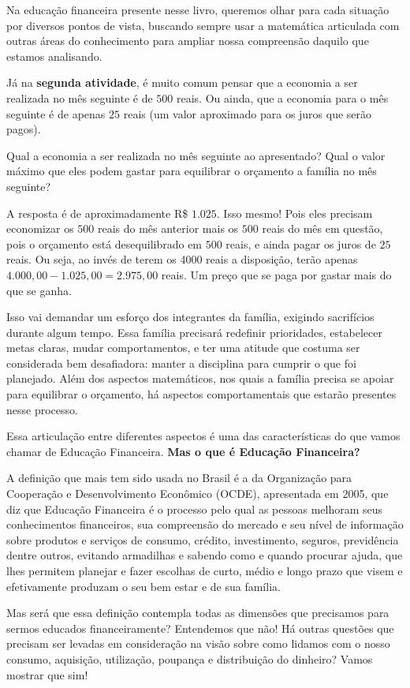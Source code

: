 Na educação financeira presente nesse livro, queremos olhar para cada situação por diversos pontos de vista, buscando sempre usar a matemática articulada com outras áreas do conhecimento para ampliar nossa compreensão daquilo que estamos analisando.

Já na \textbf{segunda atividade}, é muito comum pensar que a economia a ser realizada no mês seguinte é de $500$ reais. Ou ainda, que a economia para o mês seguinte é de apenas $25$ reais (um valor aproximado para os juros que serão pagos). 


Qual a economia a ser realizada no mês seguinte ao apresentado? Qual o valor máximo que eles podem gastar para equilibrar o orçamento a família no mês seguinte? 

A resposta é de aproximadamente R\$ $1.025$. Isso mesmo! Pois eles precisam economizar os $500$ reais do mês anterior mais os $500$ reais do mês em questão, pois o orçamento está desequilibrado em $500$ reais, e ainda pagar os juros de $25$ reais. Ou seja, ao invés de terem os 4000 reais a disposição, terão apenas $4.000{,}00 - 1.025{,}00 = 2.975{,}00$ reais. Um preço que se paga por gastar mais do que se ganha.

Isso vai demandar um esforço dos integrantes da família, exigindo sacrifícios durante algum tempo. Essa família precisará redefinir prioridades, estabelecer metas claras, mudar comportamentos, e ter uma atitude que costuma ser considerada bem desafiadora: manter a disciplina para cumprir o que foi planejado. Além dos aspectos matemáticos, nos quais a família precisa se apoiar para equilibrar o orçamento, há aspectos comportamentais que estarão presentes nesse processo.

Essa articulação entre diferentes aspectos é uma das características do que vamos chamar de Educação Financeira. \textbf{Mas o que é Educação Financeira?}

A definição que mais tem sido usada no Brasil é a da Organização para Cooperação e Desenvolvimento Econômico (OCDE), apresentada em 2005, que diz que Educação Financeira é o processo pelo qual as pessoas melhoram seus conhecimentos financeiros, sua compreensão do mercado e seu nível de informação sobre produtos e serviços de consumo, crédito, investimento, seguros, previdência dentre outros, evitando armadilhas e sabendo como e quando procurar ajuda, que lhes permitem planejar e fazer escolhas de curto, médio e longo prazo que visem e efetivamente produzam o seu bem estar e de sua família.

Mas será que essa definição contempla todas as dimensões que precisamos para sermos educados financeiramente? Entendemos que não! Há outras questões que precisam ser levadas em consideração na visão sobre como lidamos com o nosso consumo, aquisição, utilização, poupança e distribuição do dinheiro? Vamos mostrar que sim!

